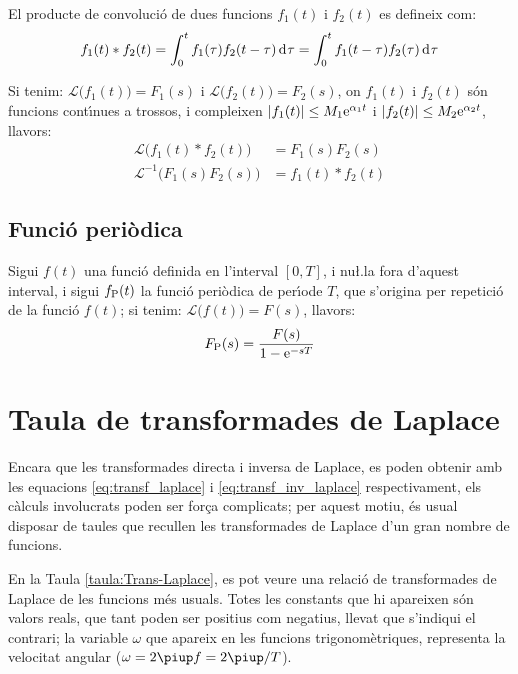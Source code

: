 El producte de convoluci\'{o} de dues funcions $f_1(t)$ i $f_2(t)$ es
defineix com:
\begin{equation}
    f_1(t) * f_2(t) = \int_0^t f_1(\tau) f_2(t-\tau) \diff\tau =
    \int_0^t f_1(t-\tau) f_2(\tau) \diff\tau
\end{equation}

Si tenim: $\mathcal{L} \bigl(f_1(t) \bigr) = F_1(s)$ i $\mathcal{L}
\bigl(f_2(t) \bigr) = F_2(s)$, on $f_1(t)$ i $f_2(t)$ s\'{o}n funcions
cont\'{\i}nues a trossos, i compleixen $|f_1(t)|\leq M_1\mathrm{e}^{\alpha_1 t}$
i $|f_2(t)|\leq M_2\mathrm{e}^{\alpha_2 t}$, llavors:
\begin{align}
    \mathcal{L} \bigl( f_1(t) * f_2(t) \bigr) &= F_1(s) F_2(s)\\
    \mathcal{L}^{-1} \bigl( F_1(s) F_2(s) \bigr) &= f_1(t) * f_2(t)
\end{align}

\subsection{Funci\'{o} peri\`{o}dica}

Sigui $f(t)$ una funci\'{o} definida en l'interval $[0,T]$, i nu{\l.l}a
fora d'aquest interval, i sigui $f_\mathrm{P}(t)$ la funci\'{o} peri\`{o}dica de
per\'{\i}ode $T$, que s'origina per repetici\'{o} de la funci\'{o} $f(t)$; si
tenim: $\mathcal{L} \bigl(f(t) \bigr) = F(s)$, llavors:
\begin{equation}
    F_\mathrm{P}(s) = \frac{F(s)}{1-\mathrm{e}^{-sT}}
\end{equation}

\section{Taula de transformades de Laplace}

Encara que les transformades directa i inversa de Laplace, es poden
obtenir amb les equacions \eqref{eq:transf_laplace} i
\eqref{eq:transf_inv_laplace} respectivament, els c\`{a}lculs
involucrats poden ser for\c{c}a complicats; per aquest motiu, \'{e}s usual
disposar de taules que recullen les transformades de Laplace d'un
gran nombre de funcions.

En la Taula \vref{taula:Trans-Laplace}, es pot veure una relaci\'{o} de
transformades de Laplace de les funcions m\'{e}s usuals. Totes les
constants que hi apareixen s\'{o}n valors reals, que tant poden ser
positius com negatius, llevat que s'indiqui el contrari; la variable
$\omega$ que apareix en les funcions trigonom\`{e}triques, representa la
velocitat angular ($\omega=2\piup f=2\piup/T$).

